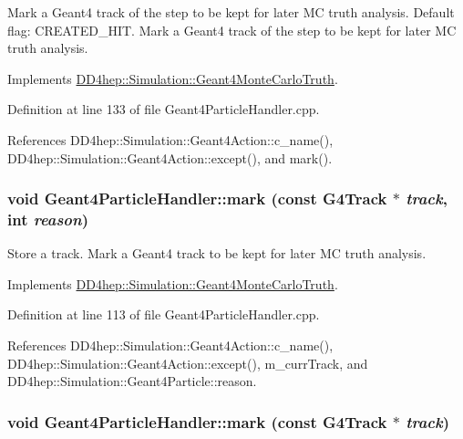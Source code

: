 Mark a Geant4 track of the step to be kept for later MC truth analysis. Default flag: CREATED\_\-HIT. Mark a Geant4 track of the step to be kept for later MC truth analysis. 

Implements \hyperlink{class_d_d4hep_1_1_simulation_1_1_geant4_monte_carlo_truth_a6aa3674a7c9e2f0132251bf05c7dab88}{DD4hep::Simulation::Geant4MonteCarloTruth}.

Definition at line 133 of file Geant4ParticleHandler.cpp.

References DD4hep::Simulation::Geant4Action::c\_\-name(), DD4hep::Simulation::Geant4Action::except(), and mark().\hypertarget{class_d_d4hep_1_1_simulation_1_1_geant4_particle_handler_a3ad0a4c70220326e76da4dd79c95501c}{
\subsubsection[{mark}]{\setlength{\rightskip}{0pt plus 5cm}void Geant4ParticleHandler::mark (const G4Track $\ast$ {\em track}, \/  int {\em reason})}}
\label{class_d_d4hep_1_1_simulation_1_1_geant4_particle_handler_a3ad0a4c70220326e76da4dd79c95501c}


Store a track. Mark a Geant4 track to be kept for later MC truth analysis. 

Implements \hyperlink{class_d_d4hep_1_1_simulation_1_1_geant4_monte_carlo_truth_a6b63ab3d0ac424aba1088fb9ea2994dc}{DD4hep::Simulation::Geant4MonteCarloTruth}.

Definition at line 113 of file Geant4ParticleHandler.cpp.

References DD4hep::Simulation::Geant4Action::c\_\-name(), DD4hep::Simulation::Geant4Action::except(), m\_\-currTrack, and DD4hep::Simulation::Geant4Particle::reason.\hypertarget{class_d_d4hep_1_1_simulation_1_1_geant4_particle_handler_a50e23a41d610fd19644a8393da13305b}{
\subsubsection[{mark}]{\setlength{\rightskip}{0pt plus 5cm}void Geant4ParticleHandler::mark (const G4Track $\ast$ {\em track})}}
\label{class_d_d4hep_1_1_simulation_1_1_geant4_particle_handler_a50e23a41d610fd19644a8393da13305b}


